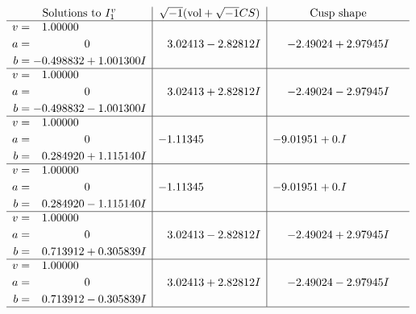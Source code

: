 \documentclass[1p]{elsarticle_modified}
\theoremstyle{definition}
\newcommand{\I}{\sqrt{-1}}
\begin{document}
$$\begin{array}{c|c|c}  
\text{Solutions to }I^v_{1}& \I (\text{vol} + \sqrt{-1}CS) & \text{Cusp shape}\\
 \hline 
\begin{aligned}
v &= \phantom{-}1.00000\phantom{ +0.000000I} \\
a &= \phantom{-0.000000 } 0 \\
b &= -0.498832 + 1.001300 I\end{aligned}
 & \phantom{-}3.02413 - 2.82812 I & -2.49024 + 2.97945 I \\ \hline\begin{aligned}
v &= \phantom{-}1.00000\phantom{ +0.000000I} \\
a &= \phantom{-0.000000 } 0 \\
b &= -0.498832 - 1.001300 I\end{aligned}
 & \phantom{-}3.02413 + 2.82812 I & -2.49024 - 2.97945 I \\ \hline\begin{aligned}
v &= \phantom{-}1.00000\phantom{ +0.000000I} \\
a &= \phantom{-0.000000 } 0 \\
b &= \phantom{-}0.284920 + 1.115140 I\end{aligned}
 & -1.11345\phantom{ +0.000000I} & -9.01951 + 0. I\phantom{ +0.000000I} \\ \hline\begin{aligned}
v &= \phantom{-}1.00000\phantom{ +0.000000I} \\
a &= \phantom{-0.000000 } 0 \\
b &= \phantom{-}0.284920 - 1.115140 I\end{aligned}
 & -1.11345\phantom{ +0.000000I} & -9.01951 + 0. I\phantom{ +0.000000I} \\ \hline\begin{aligned}
v &= \phantom{-}1.00000\phantom{ +0.000000I} \\
a &= \phantom{-0.000000 } 0 \\
b &= \phantom{-}0.713912 + 0.305839 I\end{aligned}
 & \phantom{-}3.02413 - 2.82812 I & -2.49024 + 2.97945 I \\ \hline\begin{aligned}
v &= \phantom{-}1.00000\phantom{ +0.000000I} \\
a &= \phantom{-0.000000 } 0 \\
b &= \phantom{-}0.713912 - 0.305839 I\end{aligned}
 & \phantom{-}3.02413 + 2.82812 I & -2.49024 - 2.97945 I\\
 \hline 
 \end{array}$$\newpage\newpage\renewcommand{\arraystretch}{1}
\end{document}
